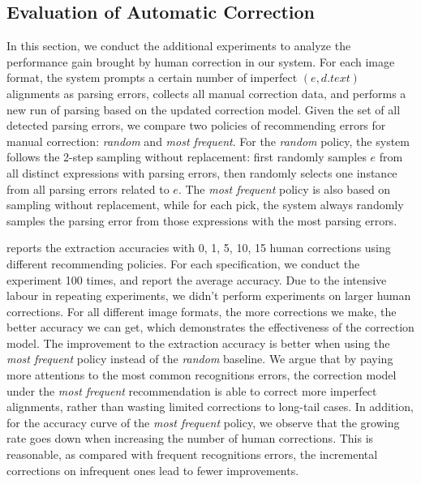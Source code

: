 \subsection{Evaluation of Automatic Correction}
In this section, we conduct the additional experiments to
analyze the performance gain brought by human correction in our system.
For each image format, the system prompts a certain number of
imperfect $(e, d.text)$ alignments as parsing errors,
collects all manual correction data,
and performs a new run of parsing based on the updated correction model.
Given the set of all detected parsing errors,
we compare two policies of recommending errors for manual correction:
\textit{random} and \textit{most frequent}.
For the \textit{random} policy,
the system follows the 2-step sampling without replacement:
first randomly samples $e$ from all distinct expressions with parsing errors,
then randomly selects one instance from all parsing errors related to $e$.
The \textit{most frequent} policy is also based on sampling without replacement,
while for each pick,
the system always randomly samples the parsing error from those expressions
with the most parsing errors.

 reports the extraction accuracies
with 0, 1, 5, 10, 15 human corrections using different recommending policies.
For each specification, we conduct the experiment 100 times,
and report the average accuracy.
Due to the intensive labour in repeating experiments,
we didn't perform experiments on larger human corrections.
For all different image formats, the more corrections we make,
the better accuracy we can get,
which demonstrates the effectiveness of the correction model.
The improvement to the extraction accuracy is better when using the
\textit{most frequent} policy instead of the \textit{random} baseline.
We argue that by paying more attentions to the most common recognitions errors,
the correction model under the \textit{most frequent} recommendation
is able to correct more imperfect alignments,
rather than wasting limited corrections to long-tail cases.
In addition, for the accuracy curve of the \textit{most frequent} policy,
we observe that the growing rate goes down when increasing the number of
human corrections.
This is reasonable, as compared with frequent recognitions errors,
the incremental corrections on infrequent ones lead to fewer improvements.


